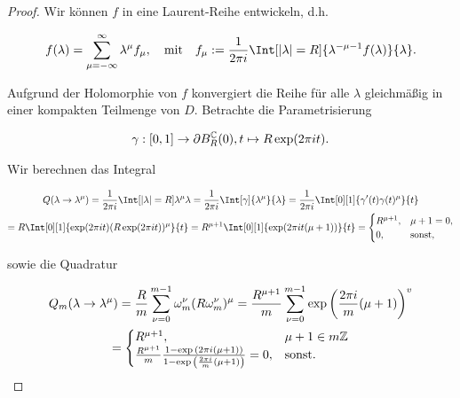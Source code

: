 \begin{proof}

    Wir können $f$ in eine Laurent-Reihe entwickeln, d.h.

    \begin{align*}
        f(\lambda) = \sum_{\mu = - \infty}^\infty \lambda^\mu f_\mu,
        \quad
        \text{mit}
        \quad
        f_\mu := \frac{1}{2\pi i} \Int[|\lambda| = R]{\lambda^{-\mu - 1} f(\lambda)}{\lambda}.
    \end{align*}

    Aufgrund der Holomorphie von $f$ konvergiert die Reihe für alle $\lambda$ gleichmäßig in einer kompakten Teilmenge von $D$.
    Betrachte die Parametrisierung

    \begin{align*}
        \gamma:
        [0,1] \to \partial B_R^{\mathbb{C}}(0),
        t \mapsto R\exp(2\pi i t).
    \end{align*}

    Wir berechnen das Integral

    \begin{multline*}
        Q(\lambda \to \lambda^\mu)
        =
        \frac{1}{2 \pi i}
        \Int[\abs{\lambda} = R]{\lambda^\mu}{\lambda}
        =
        \frac{1}{2 \pi i}
        \Int[\gamma]{\lambda^\mu}{\lambda}
        =
        \frac{1}{2 \pi i}
        \Int[0][1]{\gamma^\prime(t) \gamma(t)^\mu}{t} \\
        =
        R
        \Int[0][1]{\exp(2 \pi i t)(R \exp(2 \pi i t))^\mu}{t}
        =
        R^{\mu + 1}
        \Int[0][1]{\exp(2\pi i t(\mu + 1))}{t}
        =
        \begin{cases}
            R^{\mu + 1}, & \mu + 1 = 0, \\
            0,           & \text{sonst},
        \end{cases}
    \end{multline*}

    sowie die Quadratur

    \begin{multline*}
        Q_m(\lambda \to \lambda^\mu)
        =
        \frac{R}{m}
        \sum_{\nu = 0}^{m - 1}
            \omega_m^\nu (R \omega_m^\nu)^\mu
        =
        \frac{R^{\mu + 1}}{m}
        \sum_{\nu = 0}^{m - 1}
            \exp {\left ( \frac{2\pi i}{m}(\mu + 1) \right )}^v \\
        =
        \begin{cases}
            R^{\mu + 1},
            & \mu + 1 \in m \mathbb{Z} \\
            \frac{R^{\mu + 1}}{m}
            \frac
            {
                1 - \exp {\left ( 2 \pi i(\mu + 1) \right )}
            }{
                1 - \exp {\left ( \frac{2\pi i}{m}(\mu + 1) \right )}
            }
            =
            0,
            & \text{sonst}.
        \end{cases}
    \end{multline*}
    

\end{proof}
